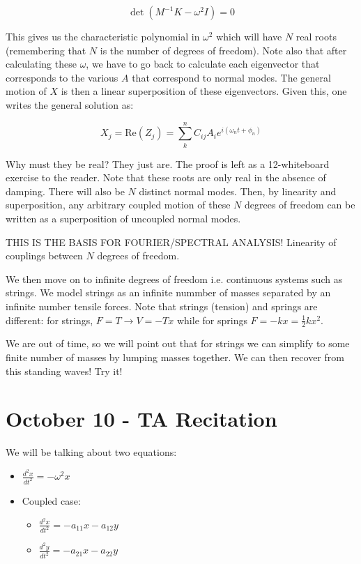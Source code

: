 \documentclass{report}
\begin{document}
$$\det (M^{-1}K - \omega^2I) = 0$$

This gives us the characteristic polynomial in $\omega^2$ which will have $N$ real roots (remembering that $N$ is the number of degrees of freedom). Note also that after calculating these $\omega$, we have to go back to calculate each eigenvector that corresponds to the various $A$ that correspond to normal modes. The general motion of $X$ is then a linear superposition of these eigenvectors. Given this, one writes the general solution as:

$$X_j = \mathrm{Re}(Z_j) = \displaystyle\sum\limits_k^n C_{ij}A_ie^{i(\omega_n t + \phi_n)}$$

Why must they be real? They just are. The proof is left as a 12-whiteboard exercise to the reader. Note that these roots are only real in the absence of damping. There will also be $N$ distinct normal modes. Then, by linearity and superposition, any arbitrary coupled motion of these $N$ degrees of freedom can be written as a superposition of uncoupled normal modes.

THIS IS THE BASIS FOR FOURIER/SPECTRAL ANALYSIS! Linearity of couplings between $N$ degrees of freedom.

We then move on to infinite degrees of freedom i.e. continuous systems such as strings. We model strings as an infinite nummber of masses separated by an infinite number tensile forces. Note that strings (tension) and springs are different: for strings, $F = T \rightarrow V = -Tx$ while for springs $F = -kx = \frac{1}{2}kx^2$.

We are out of time, so we will point out that for strings we can simplify to some finite number of masses by lumping masses together. We can then recover from this standing waves! Try it! 

\chapter{October 10 - TA Recitation}

We will be talking about two equations:

\begin{itemize}
\item $\frac{d^2x}{dt^2} = -\omega^2x$
\item Coupled case: \begin{itemize}
\item $\frac{d^2x}{dt^2} = -a_{11}x - a_{12}y$
\item $\frac{d^2y}{dt^2} = -a_{21}x - a_{22}y$
\end{itemize}\end{itemize}
\end{document}
